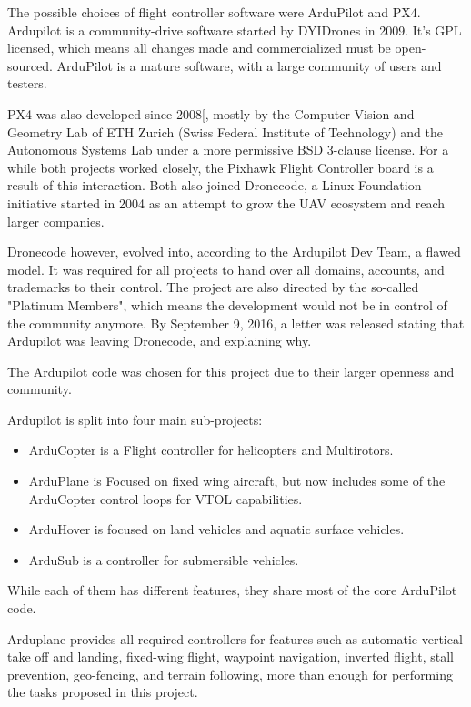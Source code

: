 The possible choices of flight controller software were ArduPilot and PX4.
%
Ardupilot is a community-drive software started by DYIDrones in 2009\cite{diydrones}.
%
It's GPL licensed, which means all changes made and commercialized must be open-sourced\cite{gplv3}.
%
ArduPilot is a mature software, with a large community of users and testers.
%

PX4 was also developed since 2008[\cite{waybackmachine}, mostly by the Computer Vision and Geometry Lab of ETH Zurich (Swiss Federal Institute of Technology)\cite{computervision} and the Autonomous Systems Lab\cite{autonomouslab} under a more permissive BSD 3-clause license\cite{bsd}.
%
For a while both projects worked closely, the Pixhawk Flight Controller board is a result of this interaction.
%
Both also joined Dronecode\cite{dronecode}, a Linux Foundation\cite{linuxfoundation} initiative started in 2004 as an attempt to grow the UAV ecosystem and reach larger companies.
%

Dronecode however, evolved into, according to the Ardupilot Dev Team, a flawed model.
%
It was required for all projects to hand over all domains, accounts, and trademarks to their control.
%
The project are also directed by the so-called "Platinum Members", which means the development would not be in control of the community anymore.
%
By September 9, 2016, a letter was released stating that Ardupilot was leaving Dronecode, and explaining why\cite{letter}.

The Ardupilot code was chosen for this project due to their larger openness and community.

Ardupilot is split into four main sub-projects:
\begin{itemize}
\item ArduCopter is a Flight controller for helicopters and Multirotors.
\item ArduPlane is Focused on fixed wing aircraft, but now includes some of the ArduCopter control loops for VTOL capabilities.
\item ArduHover is focused on land vehicles and aquatic surface vehicles.
\item ArduSub is a controller for submersible vehicles.
\end{itemize}

While each of them has different features, they share most of the core ArduPilot code.

Arduplane provides all required controllers for features such as automatic vertical take off and landing, fixed-wing flight, waypoint navigation, inverted flight, stall prevention, geo-fencing, and terrain following, more than enough for performing the tasks proposed in this project.


